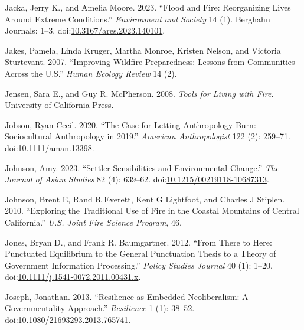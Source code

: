 \documentclass[
]{article}
\newlength{\cslhangindent}
\newenvironment{CSLReferences}[2] %
 {\begin{list}{}{%
  \setlength{\itemindent}{0pt}
  \setlength{\leftmargin}{0pt}
  \setlength{\parsep}{0pt}
  \ifodd #1
   \setlength{\leftmargin}{\cslhangindent}
   \setlength{\itemindent}{-1\cslhangindent}
  \fi
  \setlength{\itemsep}{#2\baselineskip}}}
 {\end{list}}
\begin{document}
\begin{CSLReferences}{1}{0}
Jacka, Jerry K., and Amelia Moore. 2023. {``Flood and {Fire}: {Reorganizing Lives} Around {Extreme Conditions}.''} \emph{Environment and Society} 14 (1). Berghahn Journals: 1--3. doi:\href{https://doi.org/10.3167/ares.2023.140101}{10.3167/ares.2023.140101}.

Jakes, Pamela, Linda Kruger, Martha Monroe, Kristen Nelson, and Victoria Sturtevant. 2007. {``Improving {Wildfire Preparedness}: {Lessons} from {Communities} Across the {U}.{S}.''} \emph{Human Ecology Review} 14 (2).

Jensen, Sara E., and Guy R. McPherson. 2008. \emph{Tools for {Living} with {Fire}}. University of California Press.

Jobson, Ryan Cecil. 2020. {``The {Case} for {Letting Anthropology Burn}: {Sociocultural Anthropology} in 2019.''} \emph{American Anthropologist} 122 (2): 259--71. doi:\href{https://doi.org/10.1111/aman.13398}{10.1111/aman.13398}.

Johnson, Amy. 2023. {``Settler {Sensibilities} and {Environmental Change}.''} \emph{The Journal of Asian Studies} 82 (4): 639--62. doi:\href{https://doi.org/10.1215/00219118-10687313}{10.1215/00219118-10687313}.

Johnson, Brent E, Rand R Everett, Kent G Lightfoot, and Charles J Stiplen. 2010. {``Exploring the {Traditional Use} of {Fire} in the {Coastal Mountains} of {Central California}.''} \emph{U.S. Joint Fire Science Program}, 46.

Jones, Bryan D., and Frank R. Baumgartner. 2012. {``From {There} to {Here}: {Punctuated Equilibrium} to the {General Punctuation Thesis} to a {Theory} of {Government Information Processing}.''} \emph{Policy Studies Journal} 40 (1): 1--20. doi:\href{https://doi.org/10.1111/j.1541-0072.2011.00431.x}{10.1111/j.1541-0072.2011.00431.x}.

Joseph, Jonathan. 2013. {``Resilience as Embedded Neoliberalism: A Governmentality Approach.''} \emph{Resilience} 1 (1): 38--52. doi:\href{https://doi.org/10.1080/21693293.2013.765741}{10.1080/21693293.2013.765741}.


\end{CSLReferences}
\end{document}
